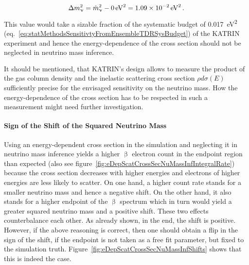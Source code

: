 \begin{equation}
	\label{eq:eDepScatCrossSecNuMassInfShiftByThisThesis}
	\Delta m_\upnu^2 = \hat{m}_\upnu^2 - \SI{0}{eV^2} = \SI{1.09e-2}{eV^2}
	\text{\,.}
\end{equation}
This value would take a sizable fraction of the systematic budget of \SI{0.017}{eV^2} (eq.~\ref{eq:statMethodsSensitivtyFromEnsembleTDRSysBudget}) of the KATRIN experiment and hence the energy-dependence of the cross section should not be neglected in neutrino mass inference. 

It should be mentioned, that KATRIN's design allows to measure the product of the gas column density and the inelastic scattering cross section $\rho d \sigma(E)$ sufficiently precise for the envisaged sensitivity on the neutrino mass. How the energy-dependence of the cross section has to be respected in such a measurement might need further investigation.

\paragraph{Sign of the Shift of the Squared Neutrino Mass}
Using an energy-dependent cross section in the simulation and neglecting it in neutrino mass inference yields a higher $\upbeta$ electron count in the endpoint region than expected (also see figure~\ref{fig:eDepScatCrossSecNuMassInfIntegralRate}) because the cross section decreases with higher energies and electrons of higher energies are less likely to scatter. On one hand, a higher count rate stands for a smaller neutrino mass and hence a negative shift. On the other hand, it also stands for a higher endpoint of the $\upbeta$ spectrum which in turn would yield a greater squared neutrino mass and a positive shift. These two effects counterbalance each other. As already shown, in the end, the shift is positive. However, if the above reasoning is correct, then one should obtain a flip in the sign of the shift, if the endpoint is not taken as a free fit parameter, but fixed to the simulation truth. Figure~\ref{fig:eDepScatCrossSecNuMassInfShifts} shows that this is indeed the case.

